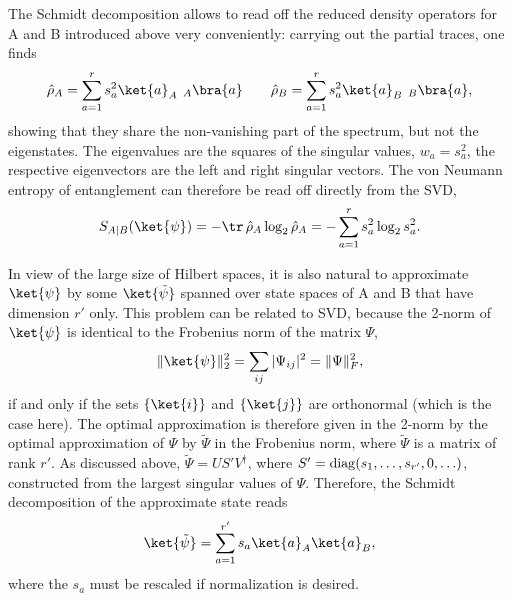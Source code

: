 The Schmidt decomposition allows to read off the reduced density operators for A and B introduced above very conveniently: carrying out the partial traces, one finds
\begin{equation}
\hat{\rho}_A = \sum_{a=1}^r s^2_a \ket{a}_A  \phantom\rangle_A \bra{a} \quad\quad \hat{\rho}_B = \sum_{a=1}^r s^2_a \ket{a}_B \phantom\rangle_B \bra{a} ,
\end{equation}
showing that they share the non-vanishing part of the spectrum, but not the eigenstates. The eigenvalues are the squares of the singular values, $w_a = s^2_a$, the respective eigenvectors are the left and right singular vectors.  The von Neumann entropy of entanglement can therefore be read off directly from the SVD,
\begin{equation}
S_{A|B}(\ket{\psi}) = - \tr\, \hat{\rho}_A \log_2 \hat{\rho}_A = - \sum_{a=1}^r s_a^2 \log_2 s_a^2 .
\end{equation}

In view of the large size of Hilbert spaces, it is also natural to approximate $\ket{\psi}$ by some $\ket{\tilde{\psi}}$ spanned over state spaces of A and B that have dimension $r'$ only. This problem can be related to SVD, because the 2-norm of $\ket{\psi}$ is identical to the Frobenius norm of the matrix $\Psi$,
\begin{equation}
\| \ket{\psi} \|_2^2 = \sum_{ij} | \Psi_{ij} |^2 = \| \Psi \|_F^2 ,
\end{equation}
if and only if the sets $\{ \ket{i} \}$ and $\{ \ket{j} \}$ are orthonormal (which is the case here).
The optimal approximation is therefore given in the 2-norm by the optimal approximation of $\Psi$ by $\tilde{\Psi}$ in the Frobenius norm, where $\tilde{\Psi}$ is a matrix of rank $r'$. As discussed above, $\tilde{\Psi} = US' V^\dagger$, where $S'={\rm diag}(s_1, \ldots, s_{r'}, 0, \ldots)$, constructed from the largest singular values of $\Psi$. Therefore, the Schmidt decomposition of the approximate state reads
\begin{equation}
\ket{\tilde{\psi}} = \sum_{a=1}^{r'} s_a \ket{a}_A \ket{a}_B ,
\label{eq:Schmidtapproximation}
\end{equation}
where the $s_a$ must be rescaled if normalization is desired.

